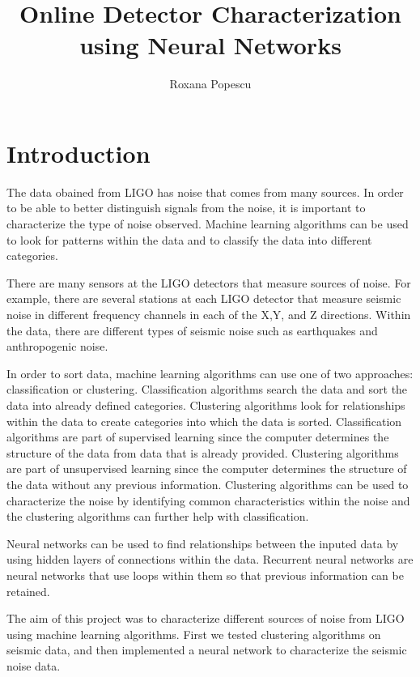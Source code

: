 \documentclass[colorlinks=true,pdfstartview=FitV,linkcolor=blue,
            citecolor=red,urlcolor=magenta]{ligodoc}
\title{Online Detector Characterization using Neural Networks}
\author{Roxana Popescu}
\begin{document}
\section{Introduction} 

\indent

\par The data obained from LIGO has noise that comes from many sources. In order to be able to better distinguish signals from the noise, it is important to characterize the type of noise observed. Machine learning algorithms can be used to look for patterns within the data and to classify the data into different categories.

\par There are many sensors at the LIGO detectors that measure sources of noise. For example, there are several stations at each LIGO detector that measure seismic noise in different frequency channels in each of the X,Y, and Z directions. Within the data, there are different types of seismic noise such as earthquakes and anthropogenic noise.  

\par In order to sort data, machine learning algorithms can use one of two approaches: classification or clustering. Classification algorithms search the data and sort the data into already defined categories. Clustering algorithms look for relationships within the data to create categories into which the data is sorted. Classification algorithms are part of supervised learning since the computer determines the structure of the data from data that is already provided. Clustering algorithms are part of unsupervised learning since the computer determines the structure of the data without any previous information. Clustering algorithms can be used to characterize the noise by identifying common characteristics within the noise and the clustering algorithms can further help with classification. \cite{Citation1}

\par Neural networks can be used to find relationships between the inputed data by using hidden layers of connections within the data. Recurrent neural networks are neural networks that use loops within them so that previous information can be retained. \cite{Citation1}

\par The aim of this project was to characterize different sources of noise from LIGO using machine learning algorithms. First we tested clustering algorithms on seismic data, and then implemented a neural network to characterize the seismic noise data. 
\end{document}
